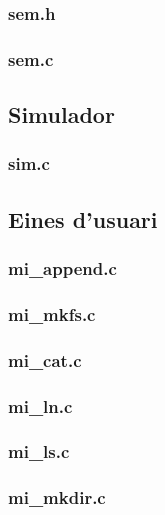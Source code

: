 
\subsubsection{sem.h}

\subsubsection{sem.c}



\subsection{Simulador}


\subsubsection{sim.c}


\subsection{Eines d'usuari}


\subsubsection{mi\_append.c}

\subsubsection{mi\_mkfs.c}

\subsubsection{mi\_cat.c}

\subsubsection{mi\_ln.c}

\subsubsection{mi\_ls.c}

\subsubsection{mi\_mkdir.c}


